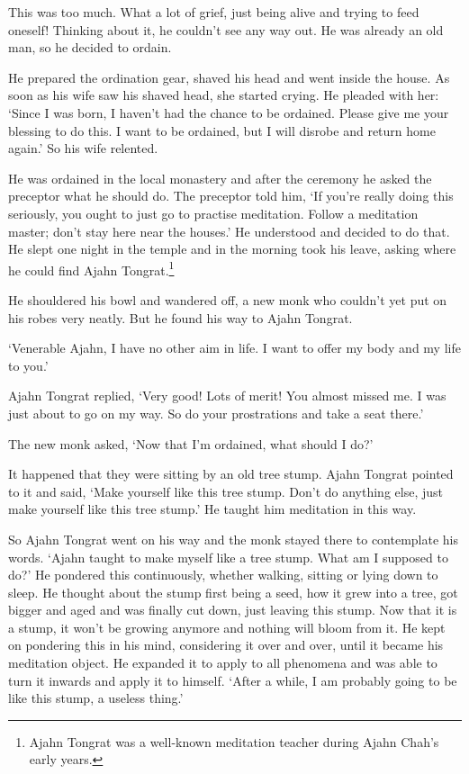This was too much. What a lot of grief, just being alive and trying to feed oneself! Thinking about it, he couldn't see any way out. He was already an old man, so he decided to ordain. 

He prepared the ordination gear, shaved his head and went inside the house. As soon as his wife saw his shaved head, she started crying. He pleaded with her: `Since I was born, I haven't had the chance to be ordained. Please give me your blessing to do this. I want to be ordained, but I will disrobe and return home again.' So his wife relented. 

He was ordained in the local monastery and after the ceremony he asked the preceptor what he should do. The preceptor told him, `If you're really doing this seriously, you ought to just go to practise meditation. Follow a meditation master; don't stay here near the houses.' He understood and decided to do that. He slept one night in the temple and in the morning took his leave, asking where he could find Ajahn Tongrat.\footnote{Ajahn Tongrat was a well-known meditation teacher during Ajahn Chah's early years.}

He shouldered his bowl and wandered off, a new monk who couldn't yet put on his robes very neatly. But he found his way to Ajahn Tongrat. 

`Venerable Ajahn, I have no other aim in life. I want to offer my body and my life to you.' 

Ajahn Tongrat replied, `Very good! Lots of merit! You almost missed me. I was just about to go on my way. So do your prostrations and take a seat there.' 

The new monk asked, `Now that I'm ordained, what should I do?' 

It happened that they were sitting by an old tree stump. Ajahn Tongrat pointed to it and said, `Make yourself like this tree stump. Don't do anything else, just make yourself like this tree stump.' He taught him meditation in this way. 

So Ajahn Tongrat went on his way and the monk stayed there to contemplate his words. `Ajahn taught to make myself like a tree stump. What am I supposed to do?' He pondered this continuously, whether walking, sitting or lying down to sleep. He thought about the stump first being a seed, how it grew into a tree, got bigger and aged and was finally cut down, just leaving this stump. Now that it is a stump, it won't be growing anymore and nothing will bloom from it. He kept on pondering this in his mind, considering it over and over, until it became his meditation object. He expanded it to apply to all phenomena and was able to turn it inwards and apply it to himself. `After a while, I am probably going to be like this stump, a useless thing.' 

